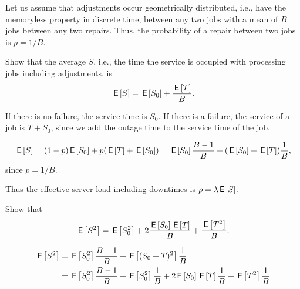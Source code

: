 \begin{comment}
The number of jobs that arrive, on average, during one
  production cycle must be smaller than the total amount of jobs that
  can be served, on average, during one cycle.   The number of arrivals during the repair is $\lambda \E{T}$. The number of arrivals during serving the batch is $\lambda B \E{S}$. Thus, 
  \begin{equation*}
    \lambda ( B \E S + \E{T}) \leq B.
  \end{equation*}
  When equality holds here, the system is critically loaded. As we
  discussed before, that it not a good idea.

Finally, bring $B$ to one side.
\end{solution}
\end{exercise}
\end{comment}

Let us assume that adjustments occur geometrically distributed, i.e., have the memoryless property in discrete time, between any two jobs with a mean of $B$ jobs between any two repairs.  Thus, the probability of a repair between two jobs is $p=1/B$. 

\begin{exercise}
  Show that the average  $S$, i.e., the time the service is occupied with processing jobs including adjustments, is 
  \begin{equation*}
    \,\mathsf{E}\left[S\right] = \,\mathsf{E}\left[S_0\right] + \frac{\,\mathsf{E}\left[T\right]}B.
  \end{equation*}
\begin{hint}
If there is no failure, the service time is $S_0$. If there is a failure, the service of a job is $T + S_0$, since we add the outage time to the service time of the job. 
\end{hint}
  \begin{solution}
    \begin{equation*}
      \,\mathsf{E}\left[S\right] = (1-p)\,\mathsf{E}\left[S_0\right] + p (\,\mathsf{E}\left[T\right] + \,\mathsf{E}\left[S_0\right]) = \,\mathsf{E}\left[S_0\right] \frac{B-1}B + (\,\mathsf{E}\left[S_0\right] + \,\mathsf{E}\left[T\right]) \frac 1B,
    \end{equation*}
since $p=1/B$. 
  \end{solution}
\end{exercise}

Thus the effective server load including downtimes is $\rho = \lambda \,\mathsf{E}\left[S\right]$. 

\begin{exercise}
  Show that
  \begin{equation*}
    \,\mathsf{E}\left[S^2\right] = \,\mathsf{E}\left[S_0^2\right] + 2\frac{\,\mathsf{E}\left[S_0\right]\,\mathsf{E}\left[T\right]} B + \frac{\,\mathsf{E}\left[T^2\right]}B.
  \end{equation*}
  \begin{solution}
  \begin{equation*}
    \begin{split}
    \,\mathsf{E}\left[S^2\right] 
&= \,\mathsf{E}\left[S_0^2\right]\frac{B-1}B + \,\mathsf{E}\left[(S_0+T)^2\right]\frac 1B \\
&= \,\mathsf{E}\left[S_0^2\right]\frac{B-1}B + \,\mathsf{E}\left[S_0^2\right] \frac 1 B + 2 \,\mathsf{E}\left[S_0\right] \,\mathsf{E}\left[T\right]\frac 1B + \,\mathsf{E}\left[T^2\right]\frac 1B
    \end{split}
  \end{equation*}
  \end{solution}
\end{exercise}

